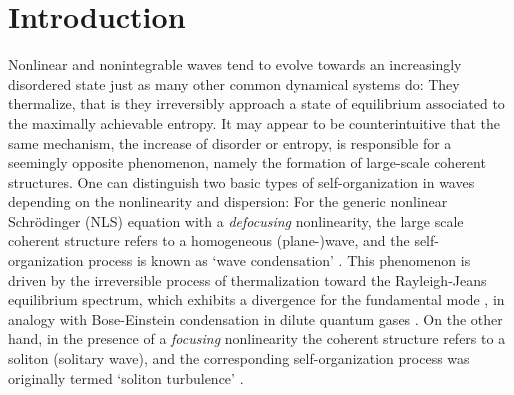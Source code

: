 \documentclass[pra,twocolumn,showpacs,preprintnumbers,amsmath,amssymb]{revtex4}
\begin{document}

\maketitle


\section{Introduction}

Nonlinear and nonintegrable waves tend to evolve towards an increasingly disordered state just as  many other common dynamical systems do: They thermalize, that is they irreversibly approach a state of equilibrium associated to the maximally achievable entropy. 
It may appear to be  counterintuitive that the same mechanism, the increase of disorder or entropy, is responsible for a seemingly opposite phenomenon, namely the formation of large-scale coherent structures. 
One can distinguish two basic types of self-organization in waves 
depending on the nonlinearity and dispersion: 
For the generic nonlinear Schr\"odinger (NLS) equation with a {\it defocusing} nonlinearity, the large scale coherent structure refers to a homogeneous (plane-)wave, and the self-organization process is known as `wave condensation' \cite{dyachenko92,nazarenko05,PRL05,PD09,PRA11b,
proment12,derevyanko12,onorato14,nazarenko}.
This phenomenon is driven by the irreversible process of thermalization toward the Rayleigh-Jeans  equilibrium spectrum, which exhibits a divergence for the fundamental mode \cite{PRL05,PRA11b}, in analogy with Bose-Einstein condensation in dilute quantum gases \cite{stringari,davis01,bec-c,nazarenko}.
On the other hand, in the presence of a {\it focusing} nonlinearity the coherent structure refers to a soliton (solitary wave), and the corresponding self-organization process was originally termed `soliton turbulence' \cite{zakharov88,zakharov89,jordan,rumpf01,rumpf03,ZakhPhysRep01,
nazarenkoPR,nazarenko,rumpfPRL09,PR14,shalva}.
\end{document}
